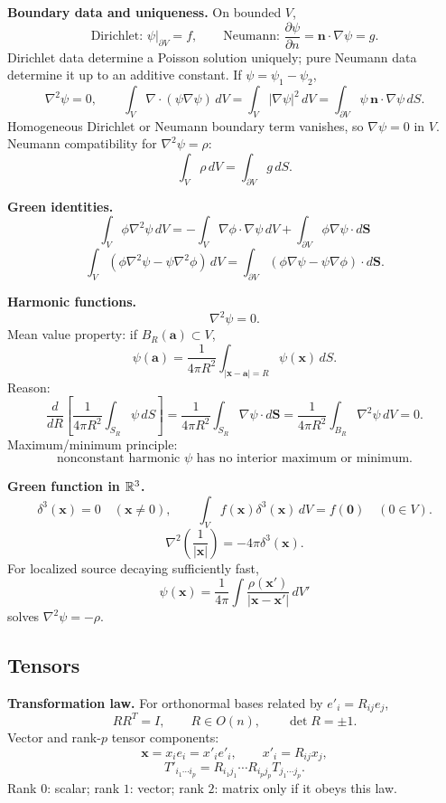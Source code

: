 \noindent\textbf{Boundary data and uniqueness.}
On bounded $V$,
\[
\text{Dirichlet: }\psi|_{\partial V}=f,\qquad
\text{Neumann: }\frac{\partial\psi}{\partial n}
=\mathbf{n}\cdot\nabla\psi=g.
\]
Dirichlet data determine a Poisson solution uniquely; pure Neumann data determine it
up to an additive constant. If $\psi=\psi_1-\psi_2$,
\[
\nabla^2\psi=0,\qquad
\int_V\nabla\cdot(\psi\nabla\psi)\,dV
=\int_V|\nabla\psi|^2\,dV
=\int_{\partial V}\psi\,\mathbf{n}\cdot\nabla\psi\,dS.
\]
Homogeneous Dirichlet or Neumann boundary term vanishes, so $\nabla\psi=0$ in $V$.
Neumann compatibility for $\nabla^2\psi=\rho$:
\[
\boxed{\int_V\rho\,dV=\int_{\partial V}g\,dS.}
\]

\noindent\textbf{Green identities.}
\[
\boxed{
\int_V\phi\nabla^2\psi\,dV
=-\int_V\nabla\phi\cdot\nabla\psi\,dV
+\int_{\partial V}\phi\nabla\psi\cdot d\mathbf{S}}
\]
\[
\boxed{
\int_V(\phi\nabla^2\psi-\psi\nabla^2\phi)\,dV
=\int_{\partial V}(\phi\nabla\psi-\psi\nabla\phi)\cdot d\mathbf{S}.}
\]

\noindent\textbf{Harmonic functions.}
\[
\boxed{\nabla^2\psi=0.}
\]
Mean value property: if $B_R(\mathbf{a})\subset V$,
\[
\boxed{\psi(\mathbf{a})
=\frac{1}{4\pi R^2}
\int_{|\mathbf{x}-\mathbf{a}|=R}\psi(\mathbf{x})\,dS.}
\]
Reason:
\[
\frac{d}{dR}\left[
\frac{1}{4\pi R^2}\int_{S_R}\psi\,dS\right]
=\frac{1}{4\pi R^2}\int_{S_R}\nabla\psi\cdot d\mathbf{S}
=\frac{1}{4\pi R^2}\int_{B_R}\nabla^2\psi\,dV=0.
\]
Maximum/minimum principle:
\[
\boxed{\text{nonconstant harmonic }\psi\text{ has no interior maximum or minimum}.}
\]

\noindent\textbf{Green function in \texorpdfstring{$\mathbb{R}^3$}{R3}.}
\[
\delta^3(\mathbf{x})=0\quad(\mathbf{x}\ne0),\qquad
\int_V f(\mathbf{x})\delta^3(\mathbf{x})\,dV=f(\mathbf{0})\quad(0\in V).
\]
\[
\boxed{\nabla^2\left(\frac{1}{|\mathbf{x}|}\right)
=-4\pi\delta^3(\mathbf{x})}.
\]
For localized source decaying sufficiently fast,
\[
\boxed{\psi(\mathbf{x})
=\frac{1}{4\pi}\int
\frac{\rho(\mathbf{x}')}{|\mathbf{x}-\mathbf{x}'|}\,dV'}
\]
solves $\nabla^2\psi=-\rho$.

\subsection{Tensors}

\noindent\textbf{Transformation law.}
For orthonormal bases related by $e'_i=R_{ij}e_j$,
\[
RR^T=I,\qquad R\in O(n),\qquad \det R=\pm1.
\]
Vector and rank-$p$ tensor components:
\[
\mathbf{x}=x_i e_i=x'_i e'_i,\qquad x'_i=R_{ij}x_j,
\]
\[
\boxed{T'_{i_1\cdots i_p}
=R_{i_1j_1}\cdots R_{i_pj_p}T_{j_1\cdots j_p}.}
\]
Rank $0$: scalar; rank $1$: vector; rank $2$: matrix only if it obeys this law.

